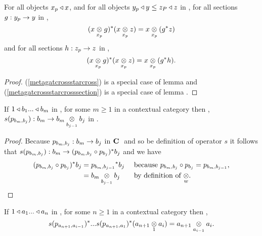 
\vspace{0.15cm}
\begin{lemma}
For all objects $x_p \base x$, and for all objects $y_p \base y \leq z_P \base z$ in \catc, 
for all sections $g:y_p \morph y$ in \catc, 
\begin{equation}
\label{metagatcrossstarcross}
(\crossx{x}{g}{x_p})^*(\crossx{x}{z}{x_p})=\crossx{x}{(g^*z)}{x_p}
\end{equation}
and for all sections $h:z_p \morph z$ in \catc,
\begin{equation}
\label{metagatcrossstarcrosssection}
(\crossx{x}{g}{x_p})^*(\crossx{x}{z}{x_p})=\crossx{x}{(g^*h)}{x_p}.
\end{equation}
\end{lemma}
\begin{proof}
(\ref{metagatcrossstarcross}) is a special case of lemma 
and
(\ref{metagatcrossstarcrosssection}) is a special case of lemma .
\end{proof}
\begin{lemma}
If $1 \base b_1 ... \base b_m$ in \catc, for some $m \ge 1$ in a contextual category \catc then \foreachj,
$s(p_{b_m,b_j}): b_m \morph \crossx{b_m}{b_j}{b_{j-1}}$ in \catcw.
\end{lemma}
\begin{proof}
Because $p_{b_m,b_j}: b_m \morph b_j$ in $\catcw$ and so be definition of operator $s$ it follows that $s(p_{b_m,b_j}): b_m  \morph (p_{b_m,b_j} \circ p_{b_j})^*b_j$
and we have 
\begin{align*}
(p_{b_m,b_j} \circ p_{b_j})^*b_j &= {p_{b_m,b_{j-1}}} ^* b_j  && \mbox{ because $p_{b_m,b_j} \circ p_{b_j}=p_{b_m,b_{j-1}}$,} \\
                                 &= \crossx{b_m}{b_j}{b_{j-1}} && \mbox{ by definition of $\crossx{}{}{w}$}.
\end{align*}
\end{proof}
\begin{lemma}
If $1 \base a_1 ... \base a_n$ in \catc, for some $n \ge 1$ in a contextual category \catc then \foreachi,
\begin{equation*}
s(p_{a_{n+1},a_{i-1}})^*...s(p_{a_{n+1},a_1})^*(\crossx{a_{n+1}}{a_i}{1}) 
= \crossx{a_{n+1}}{a_i}{a_{i-1}}.
\end{equation*} 
\end{lemma}
